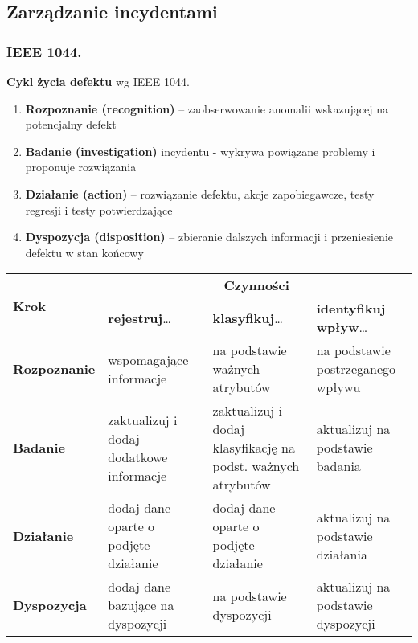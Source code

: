 \documentclass[../main.tex]{subfiles}
\begin{document}
    \subsection{Zarządzanie incydentami}
    \subsubsection{IEEE 1044.}
    \textbf{Cykl życia defektu} wg IEEE 1044.
    \begin{enumerate}
        \item \textbf{Rozpoznanie (recognition)} – zaobserwowanie anomalii wskazującej na potencjalny defekt
        \item \textbf{Badanie (investigation)} incydentu - wykrywa powiązane problemy i proponuje rozwiązania
        \item \textbf{Działanie (action)} – rozwiązanie defektu, akcje zapobiegawcze, testy regresji i testy potwierdzające
        \item \textbf{Dyspozycja (disposition)} – zbieranie dalszych informacji i przeniesienie defektu w stan końcowy
    \end{enumerate}

    \begin{table}[H]
        \begin{center}
            \begin{tabular}{ | p{3cm} | p{4cm} | p{4cm} | p{4cm} |}
                \hline
                \multirow{2}{*}{\textbf{Krok}} & \multicolumn{3}{c|}{\textbf{Czynności}}\\
                \cline{2-4}
                \multirow{2}{*}{} & \textbf{rejestruj}\ldots & \textbf{klasyfikuj}\ldots & \textbf{identyfikuj wpływ}\ldots\\
                \hline
                \textbf{Rozpoznanie }& wspomagające informacje
                & na podstawie ważnych atrybutów
                & na podstawie postrzeganego wpływu\\
                \hline
                \textbf{Badanie}
                & zaktualizuj i dodaj dodatkowe informacje
                & zaktualizuj i dodaj klasyfikację na podst. ważnych atrybutów
                & aktualizuj na podstawie badania\\
                \hline
                \textbf{Działanie}
                & dodaj dane oparte o podjęte działanie
                & dodaj dane oparte o podjęte działanie
                & aktualizuj na podstawie działania\\
                \hline
                \textbf{Dyspozycja}
                & dodaj dane bazujące na dyspozycji
                & na podstawie dyspozycji
                & aktualizuj na podstawie dyspozycji\\
                \hline
            \end{tabular}
        \end{center}
    \end{table}
\end{document}

